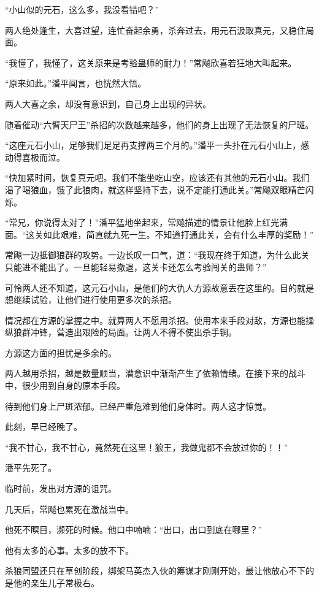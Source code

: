 \begin{this_body}
“小山似的元石，这么多，我没看错吧？”

两人绝处逢生，大喜过望，连忙奋起余勇，杀奔过去，用元石汲取真元，又稳住局面。

“我懂了，我懂了，这关原来是考验蛊师的耐力！”常飚欣喜若狂地大叫起来。

“原来如此。”潘平闻言，也恍然大悟。

两人大喜之余，却没有意识到，自己身上出现的异状。

随着催动“六臂天尸王”杀招的次数越来越多，他们的身上出现了无法恢复的尸斑。

“这座元石小山，足够我们足足再支撑两三个月的。”潘平一头扑在元石小山上，感动得喜极而泣。

“快加紧时间，恢复真元吧。我们不能坐吃山空，应该还有其他的元石小山。我们渴了喝狼血，饿了此狼肉，就这样坚持下去，说不定能打通此关。”常飚双眼精芒闪烁。

“常兄，你说得太对了！”潘平猛地坐起来，常飚描述的情景让他脸上红光满面。“这关如此艰难，简直就九死一生。不知道打通此关，会有什么丰厚的奖励！”

常飚一边抵御狼群的攻势。一边长叹一口气，道：“我现在终于知道，为什么此关只能进不能出了。一旦能轻易撤退，这关卡还怎么考验闯关的蛊师？”

可怜两人还不知道，这元石小山，是他们的大仇人方源故意丢在这里的。目的就是想继续试验，让他们进行使用更多次的杀招。

情况都在方源的掌握之中。就算两人不愿用杀招。使用本来手段对敌，方源也能操纵狼群冲锋，营造出艰险的局面。让两人不得不使出杀手锏。

方源这方面的担忧是多余的。

两人越用杀招，越是数量顺当，潜意识中渐渐产生了依赖情绪。在接下来的战斗中，很少用到自身的原本手段。

待到他们身上尸斑浓郁。已经严重危难到他们身体时。两人这才惊觉。

此刻，早已经晚了。

“我不甘心，我不甘心，竟然死在这里！狼王，我做鬼都不会放过你的！！”

潘平先死了。

临时前，发出对方源的诅咒。

几天后，常飚也累死在激战当中。

他死不瞑目，濒死的时候。他口中喃喃：“出口，出口到底在哪里？”

他有太多的心事。太多的放不下。

杀狼同盟还只在草创阶段，绑架马英杰入伙的筹谋才刚刚开始，最让他放心不下的是他的亲生儿子常极右。


\end{this_body}
